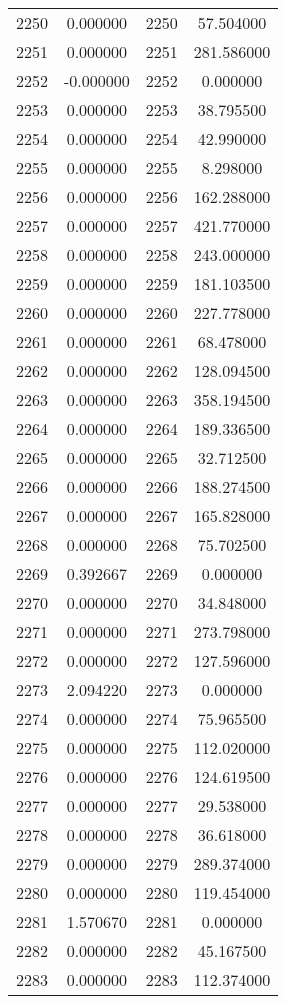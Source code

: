 \documentclass[12pt]{article}
\begin{document}
\begin{longtable}{@{}cccc@{}}
2250 & 0.000000 & 2250 & 57.504000 \\
2251 & 0.000000 & 2251 & 281.586000 \\
2252 & -0.000000 & 2252 & 0.000000 \\
2253 & 0.000000 & 2253 & 38.795500 \\
2254 & 0.000000 & 2254 & 42.990000 \\
2255 & 0.000000 & 2255 & 8.298000 \\
2256 & 0.000000 & 2256 & 162.288000 \\
2257 & 0.000000 & 2257 & 421.770000 \\
2258 & 0.000000 & 2258 & 243.000000 \\
2259 & 0.000000 & 2259 & 181.103500 \\
2260 & 0.000000 & 2260 & 227.778000 \\
2261 & 0.000000 & 2261 & 68.478000 \\
2262 & 0.000000 & 2262 & 128.094500 \\
2263 & 0.000000 & 2263 & 358.194500 \\
2264 & 0.000000 & 2264 & 189.336500 \\
2265 & 0.000000 & 2265 & 32.712500 \\
2266 & 0.000000 & 2266 & 188.274500 \\
2267 & 0.000000 & 2267 & 165.828000 \\
2268 & 0.000000 & 2268 & 75.702500 \\
2269 & 0.392667 & 2269 & 0.000000 \\
2270 & 0.000000 & 2270 & 34.848000 \\
2271 & 0.000000 & 2271 & 273.798000 \\
2272 & 0.000000 & 2272 & 127.596000 \\
2273 & 2.094220 & 2273 & 0.000000 \\
2274 & 0.000000 & 2274 & 75.965500 \\
2275 & 0.000000 & 2275 & 112.020000 \\
2276 & 0.000000 & 2276 & 124.619500 \\
2277 & 0.000000 & 2277 & 29.538000 \\
2278 & 0.000000 & 2278 & 36.618000 \\
2279 & 0.000000 & 2279 & 289.374000 \\
2280 & 0.000000 & 2280 & 119.454000 \\
2281 & 1.570670 & 2281 & 0.000000 \\
2282 & 0.000000 & 2282 & 45.167500 \\
2283 & 0.000000 & 2283 & 112.374000 \\

\end{longtable}
\end{document}

